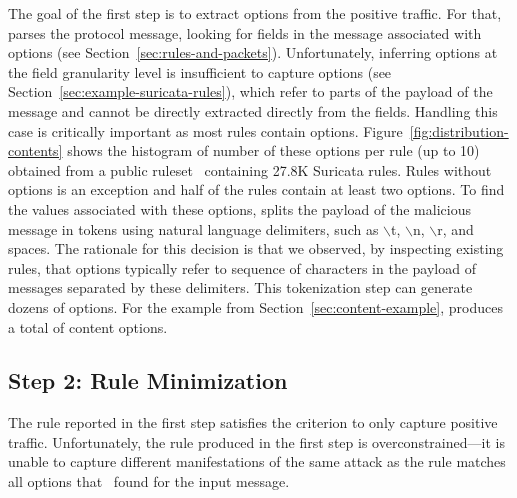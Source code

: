 \documentclass[sigconf,anonymous]{acmart}
\begin{document}
The goal of the first step is to extract options from the positive
traffic. For that, \tname{} parses the protocol message, looking for
fields in the message associated with options (see
Section~\ref{sec:rules-and-packets}).
Unfortunately, inferring options at the field granularity
level is insufficient to capture  options (see
Section~\ref{sec:example-suricata-rules}), which refer to parts of the
payload of the message and cannot be directly extracted directly from
the fields. Handling this case is critically important as most rules
contain 
options. Figure~\ref{fig:distribution-contents} shows the histogram of
number of these options per rule (up to 10) obtained from a public
ruleset~\cite{emerging-threats-open} containing 27.8K Suricata
rules. Rules without  options is an exception and half
of the rules contain at least two  options.  To find
the values associated with these options, \tname{} splits the payload
of the malicious message in tokens using natural language delimiters,
such as $\backslash$t, $\backslash$n, $\backslash$r, and spaces. The
rationale for this decision is that we observed, by inspecting
existing rules, that  options typically refer to
sequence of characters in the payload of messages separated by these
delimiters. This tokenization step can generate dozens of options. For
the example from Section~\ref{sec:content-example}, \tname{} produces
a total of  content options.


\subsection{Step 2: Rule Minimization}
\label{sec:minimization}

The rule reported in the first step satisfies the criterion to only
capture positive traffic. Unfortunately, the rule produced in the
first step is overconstrained---it is unable to capture different
manifestations of the same attack as the rule matches all options that
\tname\ found for the input message.

\end{document}
